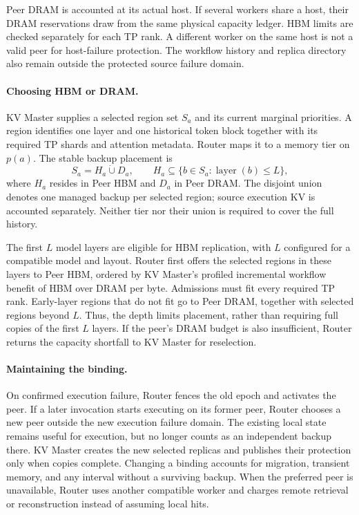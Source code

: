Peer DRAM is accounted at its actual host. If several workers share a
host, their DRAM reservations draw from the same physical capacity
ledger. HBM limits are checked separately for each TP rank. A different
worker on the same host is not a valid peer for host-failure protection.
The workflow history and replica directory also remain outside the
protected source failure domain.

\paragraph{Choosing HBM or DRAM.}
KV Master supplies a selected region set $S_a$ and its current marginal
priorities. A region identifies one layer and one historical token block
together with its required TP shards and attention metadata. Router
maps it to a memory tier on $p(a)$. The stable backup placement is
\begin{equation}
 S_a=H_a\mathbin{\dot\cup}D_a,\qquad
 H_a\subseteq\{b\in S_a:\operatorname{layer}(b)\le L\},
 \label{eq:placement}
\end{equation}
where $H_a$ resides in Peer HBM and $D_a$ in Peer DRAM. The disjoint
union denotes one managed backup per selected region; source execution
KV is accounted separately. Neither tier nor their union is required
to cover the full history.

The first $L$ model layers are eligible for HBM replication, with $L$
configured for a compatible model and layout. Router first offers the
selected regions in these layers to Peer HBM, ordered by KV Master's
profiled incremental workflow benefit of HBM over DRAM per byte.
Admissions must fit every required TP rank. Early-layer regions that
do not fit go to Peer DRAM, together with selected regions beyond $L$.
Thus, the depth limits placement, rather than requiring full copies
of the first $L$ layers. If the peer's DRAM budget is also insufficient,
Router returns the capacity shortfall to KV Master for reselection.

\paragraph{Maintaining the binding.}
On confirmed execution failure, Router fences the old epoch and
activates the peer. If a later invocation starts executing on its former
peer, Router chooses a new peer outside the new execution failure
domain. The existing local state remains useful for execution, but no
longer counts as an independent backup there. KV Master creates the
new selected replicas and publishes their protection only when copies
complete. Changing a binding accounts for migration, transient memory,
and any interval without a surviving backup. When the preferred peer
is unavailable, Router uses another compatible worker and charges
remote retrieval or reconstruction instead of assuming local hits.

